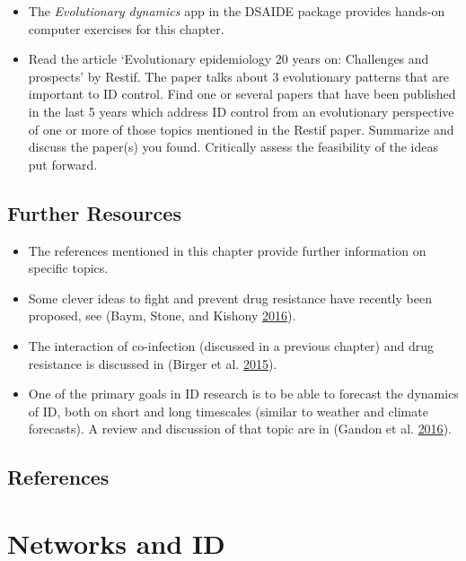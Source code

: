 \documentclass[]{book}
\providecommand{\tightlist}{%
  \setlength{\itemsep}{0pt}\setlength{\parskip}{0pt}}
\theoremstyle{definition}
\theoremstyle{definition}
\theoremstyle{definition}
\theoremstyle{remark}
\begin{document}
\begin{itemize}
\tightlist
\item
  The \emph{Evolutionary dynamics} app in the DSAIDE package provides
  hands-on computer exercises for this chapter.
\item
  Read the article `Evolutionary epidemiology 20 years on: Challenges
  and prospects' by Restif. The paper talks about 3 evolutionary
  patterns that are important to ID control. Find one or several papers
  that have been published in the last 5 years which address ID control
  from an evolutionary perspective of one or more of those topics
  mentioned in the Restif paper. Summarize and discuss the paper(s) you
  found. Critically assess the feasibility of the ideas put forward.
\end{itemize}

\section{Further Resources}\label{further-resources-12}

\begin{itemize}
\tightlist
\item
  The references mentioned in this chapter provide further information
  on specific topics.
\item
  Some clever ideas to fight and prevent drug resistance have recently
  been proposed, see (Baym, Stone, and Kishony
  \protect\hyperlink{ref-baym16}{2016}).
\item
  The interaction of co-infection (discussed in a previous chapter) and
  drug resistance is discussed in (Birger et al.
  \protect\hyperlink{ref-birger15}{2015}).
\item
  One of the primary goals in ID research is to be able to forecast the
  dynamics of ID, both on short and long timescales (similar to weather
  and climate forecasts). A review and discussion of that topic are in
  (Gandon et al. \protect\hyperlink{ref-gandon16}{2016}).
\end{itemize}

\section{References}\label{references-13}

\chapter{Networks and ID}\label{networks-and-id}
\end{document}
